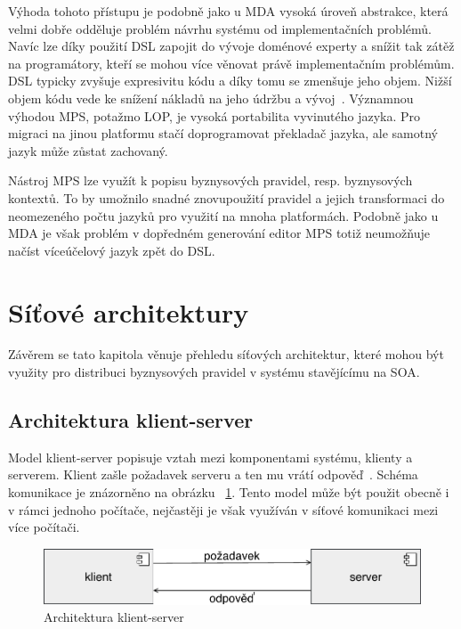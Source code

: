 Výhoda tohoto přístupu je podobně jako u \gls{MDA} vysoká úroveň abstrakce, která
velmi dobře odděluje problém návrhu systému od implementačních problémů.
Navíc lze díky použití \gls{DSL} zapojit do vývoje doménové experty a snížit tak
zátěž na programátory, kteří se mohou více věnovat právě implementačním problémům.
\gls{DSL} typicky zvyšuje expresivitu kódu a díky tomu se zmenšuje jeho objem.
Nižší objem kódu vede ke snížení nákladů na jeho údržbu a vývoj~\cite{littman1987mental}\cite{soloway1986empirical}.
Významnou výhodou MPS, potažmo \gls{LOP}, je vysoká portabilita vyvinutého jazyka.
Pro migraci na jinou platformu stačí doprogramovat překladač jazyka, ale
samotný jazyk může zůstat zachovaný.

Nástroj MPS lze využít k popisu byznysových pravidel, resp. byznysových kontextů.
To by umožnilo snadné znovupoužití pravidel a jejich transformaci do neomezeného počtu jazyků pro
využití na mnoha platformách. Podobně jako u \gls{MDA} je však problém v dopředném
generování \textendash\xspace editor MPS totiž neumožňuje načíst víceúčelový jazyk zpět do \gls{DSL}.


\section{Síťové architektury}

Závěrem se tato kapitola věnuje přehledu síťových architektur, které mohou být využity pro
distribuci byznysových pravidel v systému stavějícímu na \gls{SOA}.

\subsection{Architektura klient-server}\label{sec:client-server}

Model klient-server popisuje vztah mezi komponentami systému, klienty a serverem.
Klient zašle požadavek serveru a ten mu vrátí odpověď~\cite{berson1992client}.
Schéma komunikace je znázorněno na obrázku ~\ref{fig:client-server}.
Tento model může být použit obecně i v rámci jednoho počítače,
nejčastěji je však využíván v síťové komunikaci mezi více počítači.

\begin{figure}[t]
    \centering
    \includegraphics[keepaspectratio=true, width=0.6\linewidth]{figures/client-server.pdf}
    \caption{Architektura klient-server}
    \label{fig:client-server}
\end{figure}


